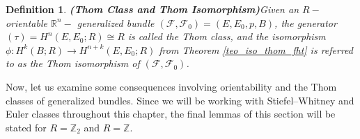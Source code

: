 \documentclass[12pt,oneside]{book}
\newtheorem{defi}   {Definition}[chapter]
\newtheorem{lem}    {Lemma}[chapter]
\newcommand{\R}{\mathbb{R}}
\newcommand{\Z}{\mathbb{Z}}
\begin{document}
    \begin{defi}{\bf (Thom Class and Thom Isomorphism)}\label{defi_thom}
    	Given an $R-$orientable $\R^{n}-$ generalized bundle $(\mathcal{F},\mathcal{F}_{0})=(E,E_{0},p,B)$, the generator 
        $(\tau)=H^{n}(E,E_{0};R)\cong R$ is called the Thom class, and the isomorphism 
        $\phi:H^{k}(B;R)\to H^{n+k}(E,E_{0};R)$ from Theorem \ref{teo_iso_thom_fht} is referred to as the Thom 
        isomorphism of $(\mathcal{F},\mathcal{F}_{0})$.
    \end{defi}

    Now, let us examine some consequences involving orientability and the Thom classes of generalized bundles. Since we will be working with 
    Stiefel–Whitney and Euler classes throughout this chapter, the final lemmas of this 
    section will be stated for $R=\Z_{2}$ and $R=\Z$.

\end{document}
